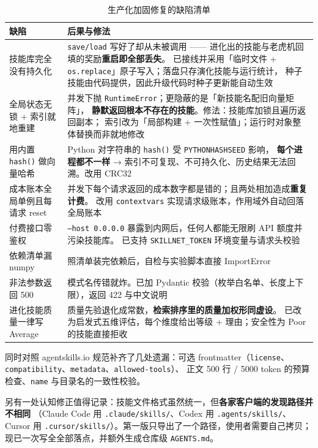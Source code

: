 \documentclass[UTF8, fontset=windows, 11pt, a4paper]{ctexart}
\begin{document}
\begin{table}[h]
\centering
\small
\begin{tabularx}{\textwidth}{@{}>{\raggedright\arraybackslash}p{4.3cm} >{\raggedright\arraybackslash}X@{}}
\toprule
\textbf{缺陷} & \textbf{后果与修法} \\
\midrule
技能库完全没有持久化 &
\texttt{save/load} 写好了却从未被调用 —— 进化出的技能与老虎机回填的奖励\textbf{重启即全部丢失}。
已接线并采用「临时文件 + \texttt{os.replace}」原子写入；落盘只存演化技能与运行统计，
种子技能由代码提供，因此升级代码时种子更新能自动生效 \\[0.25em]
全局状态无锁 + 索引就地重建 &
并发下抛 \texttt{RuntimeError}；更隐蔽的是「新技能名配旧向量矩阵」，
\textbf{静默返回根本不存在的技能}。修法：技能库加锁且遍历返回副本；
索引改为「局部构建 + 一次性赋值」；运行时对象整体替换而非就地修改 \\[0.25em]
用内置 \texttt{hash()} 做向量哈希 &
Python 对字符串的 \texttt{hash()} 受 \texttt{PYTHONHASHSEED} 影响，
\textbf{每个进程都不一样} → 索引不可复现、不可持久化、历史结果无法回溯。改用 CRC32 \\[0.25em]
成本账本全局单例且每请求 reset &
并发下每个请求返回的成本数字都是错的；且两处相加造成\textbf{重复计费}。
改用 \texttt{contextvars} 实现请求级账本，作用域外自动回落全局账本 \\[0.25em]
付费接口零鉴权 &
\texttt{--host 0.0.0.0} 暴露到内网后，任何人都能无限刷 API 额度并污染技能库。
已支持 \texttt{SKILLNET\_TOKEN} 环境变量与请求头校验 \\[0.25em]
依赖清单漏 numpy &
照清单装完依赖后，自检与实验脚本直接 ImportError \\[0.25em]
非法参数返回 500 &
模式名传错就炸。已加 Pydantic 校验（枚举白名单、长度上下限），返回 422 与中文说明 \\[0.25em]
进化技能质量一律写 Average &
质量先验退化成常数，\textbf{检索排序里的质量加权形同虚设}。
已改为启发式五维评估，每个维度给出等级 + 理由；安全性为 Poor 的技能直接拒收 \\
\bottomrule
\end{tabularx}
\caption{生产化加固修复的缺陷清单}
\end{table}

同时对照 agentskills.io 规范补齐了几处遗漏：可选 frontmatter（\texttt{license}、
\texttt{compatibility}、\texttt{metadata}、\texttt{allowed-tools}）、
正文 500 行 / 5000 token 的预算检查、\texttt{name} 与目录名的一致性校验。

另有一处认知修正值得记录：技能文件格式虽然统一，但\textbf{各家客户端的发现路径并不相同}
（Claude Code 用 \texttt{.claude/skills/}、Codex 用 \texttt{.agents/skills/}、
Cursor 用 \texttt{.cursor/skills/}）。第一版只导出了一个路径，使用者需要自己拷贝；
现已一次写全全部落点，并额外生成仓库级 \texttt{AGENTS.md}。
\end{document}
